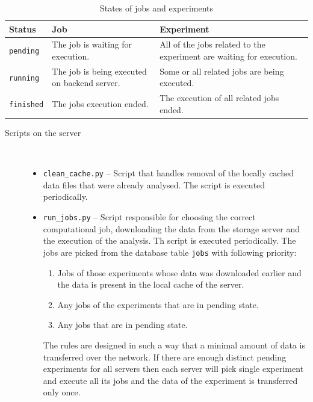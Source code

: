 \documentclass[
  digital,  	%
  color,		%
  oneside,   	%
  12pt,
  nocover,
  notable,
  nolof,
  nolot,
]{fithesis3}
\newenvironment{titlemize}[1]
{
	\begin{description}
	\item[#1]\
	\begin{itemize}
}
{
	\end{itemize}
 	\end{description}
}
\begin{document}
\begin{table}[H]
\begin{nomar}
\centering
\begin{tabular}{l || p{4cm} | p{4cm}}
\textbf{Status}   & \textbf{Job} & \textbf{Experiment} \\ \hline \hline
\texttt{pending}  & The job is waiting for execution. & All of the jobs related to the experiment are waiting for execution. \\ \hline
\texttt{running}  & The job is being \newline executed on backend server. & Some or all related jobs are being \newline executed. \\ \hline
\texttt{finished} & The jobs execution ended. & The execution of all \newline related jobs ended. \\
\end{tabular}
\end{nomar}
\caption{States of jobs and experiments}
\label{tab:states_jobs_exps}
\end{table}

\begin{titlemize}{Scripts on the server}
\item \texttt{clean\_cache.py} -- Script that handles removal of the locally cached data files that were already analysed. The script is executed periodically.
\item \texttt{run\_jobs.py} -- Script responsible for choosing the correct computational job, downloading the data from the storage server and the execution of the analysis. Th script is executed periodically. The jobs are picked from the database table \texttt{jobs} with following priority:
\begin{enumerate}
\item Jobs of those experiments whose data was downloaded earlier and the data is present in the local cache of the server.
\item Any jobs of the experiments that are in pending state.
\item Any jobs that are in pending state.
\end{enumerate}
The rules are designed in such a way that a minimal amount of data is transferred over the network. If there are enough distinct pending experiments for all servers then each server will pick single experiment and execute all its jobs and the data of the experiment is transferred only once.
\end{titlemize}
\end{document}
